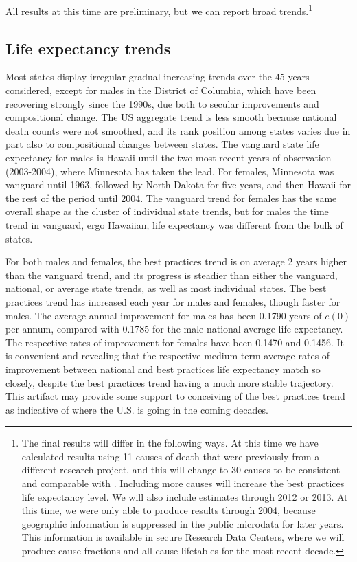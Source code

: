 \documentclass[11pt,oneside,a4paper]{article} %
\begin{document}
All results at this time are preliminary, but we can report broad trends.\footnote{The final results will differ in the following ways. At this time we have
calculated results using 11 causes of death that were previously from a
different research project, and this will change to 30 causes to be consistent and comparable with \citet{vallin2008minimum}. Including
more causes will increase the best practices life expectancy level. We will also
include estimates through 2012 or 2013. At this time, we were only able to
produce results through 2004, because geographic information is suppressed in
the public microdata for later years. This information is available in secure
Research Data Centers, where we will produce cause fractions and all-cause lifetables for
the most recent decade.} 

\subsection*{Life expectancy trends}
Most states display irregular gradual increasing trends
over the 45 years considered, except for males in the District of Columbia,
which have been recovering strongly since the 1990s, due both to secular
improvements and compositional change. The US aggregate trend is less smooth
because national death counts were not smoothed, and its rank position among
states varies due in part also to compositional changes between states. The vanguard
state life expectancy for males is Hawaii until the two most recent years of
observation (2003-2004), where Minnesota has taken the lead. For females,
Minnesota was vanguard until 1963, followed by North Dakota for five years, and
then Hawaii for the rest of the period until 2004. The vanguard trend for
females has the same overall shape as the cluster of individual state trends, but for males the time trend in vanguard, ergo Hawaiian, life expectancy was
different from the bulk of states. 

For both males and females, the best
practices trend is on average 2 years higher than the vanguard trend, and its
progress is steadier than either the vanguard, national, or average state
trends, as well as most individual states. The best practices trend has increased each year for
males and females, though faster for males. The average annual improvement for
males has been 0.1790 years of $e(0)$ per annum, compared with 0.1785 for the
male national average life expectancy. The respective rates of improvement for
females have been 0.1470 and 0.1456. It is convenient and revealing that the
respective medium term average rates of improvement between national and
best practices life expectancy match so closely, despite the best practices
trend having a much more stable trajectory. This artifact may provide some
support to conceiving of the best practices trend as indicative of where the
U.S. is going in the coming decades.
\end{document}
